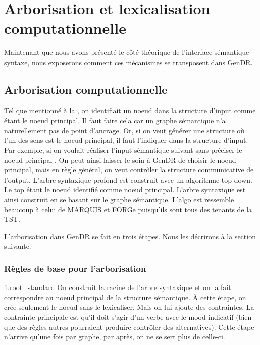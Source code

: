 
\section{Arborisation et lexicalisation computationnelle}

Maintenant que nous avons présenté le côté théorique de l'interface sémantique-syntaxe, nous exposerons comment ces mécanismes se transposent dans GenDR.

\subsection{Arborisation computationnelle}
Tel que mentionné à la , on identifiait un noeud dans la structure d'input comme étant le noeud principal. Il faut faire cela car un graphe sémantique n'a naturellement pas de point d'ancrage. Or, si on veut générer une structure où l'un des sens est le noeud principal, il faut l'indiquer dans la structure d'input. Par exemple, si on voulait réaliser l'input sémantique suivant sans préciser le noeud principal . On peut ainsi laisser le soin à GenDR de choisir le noeud principal, mais en règle général, on veut contrôler la structure communicative de l'output. L'arbre syntaxique profond est construit avec un algorithme top-down. Le top étant le noeud identifié comme noeud principal. L'arbre syntaxique est ainsi construit en se basant sur le graphe sémantique. L'algo est ressemble beaucoup à celui de MARQUIS et FORGe puisqu'ils sont tous des tenants de la TST. 

L'arborisation dans GenDR se fait en trois étapes. Nous les décrirons à la section suivante.

\subsubsection{Règles de base pour l'arborisation}

1.root\_standard On construit la racine de l'arbre syntaxique et on la fait correspondre au noeud principal de la structure sémantique. À cette étape, on crée seulement le noeud sans le lexicaliser. Mais on lui ajoute des contraintes. La contrainte principale est qu'il doit s'agir d'un verbe avec le mood indicatif (bien que des règles autres pourraient produire contrôler des alternatives). Cette étape n'arrive qu'une fois par graphe, par après, on ne se sert plus de celle-ci.

